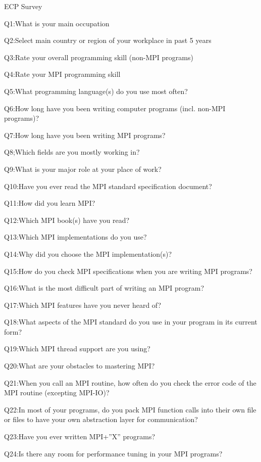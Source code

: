 
ECP Survey\cite{osti_1462877}

\begin{description}
\item Q1:What is your main occupation
\item Q2:Select main country or region of your workplace in past 5 years
\item Q3:Rate your overall programming skill (non-MPI programs)
\item Q4:Rate your MPI programming skill
\item Q5:What programming language(s) do you use most often?
\item Q6:How long have you been writing computer programs (incl. non-MPI programs)?
\item Q7:How long have you been writing MPI programs?
\item Q8;Which fields are you mostly working in?
\item Q9:What is your major role at your place of work?
\item Q10:Have you ever read the MPI standard specification document?
\item Q11:How did you learn MPI?
\item Q12:Which MPI book(s) have you read?
\item Q13:Which MPI implementations do you use?
\item Q14:Why did you choose the MPI implementation(s)?
\item Q15:How do you check MPI specifications when you are writing MPI programs?
\item Q16:What is the most difficult part of writing an MPI program?
\item Q17:Which MPI features have you never heard of?
\item Q18:What aspects of the MPI standard do you use in your program in its current form?
\item Q19:Which MPI thread support are you using?
\item Q20:What are your obstacles to mastering MPI?
\item Q21:When you call an MPI routine, how often do you check the error code of the MPI routine  (excepting MPI-IO)?
\item Q22:In most of your programs, do you pack MPI function calls into their own file or files to have your own abstraction layer for communication?
\item Q23:Have you ever written MPI+”X” programs?
\item Q24:Is there any room for performance tuning in your MPI programs?

\end{description}
